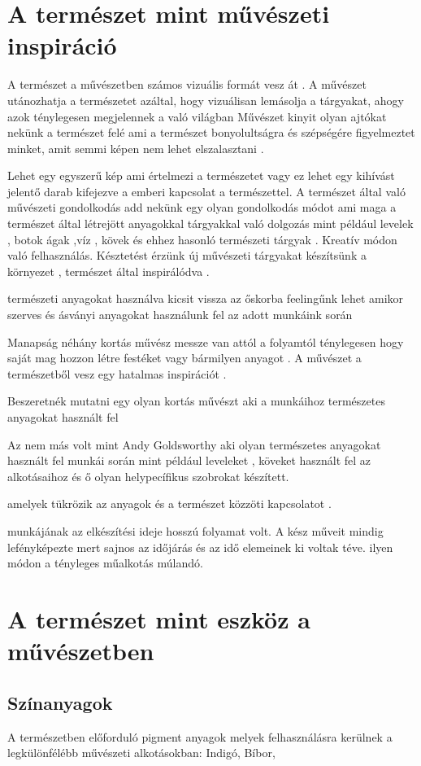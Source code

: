 \documentclass[fontsize=12pt, appendixprefix=true]{scrreprt}
\begin{document}
\section{A természet mint művészeti inspiráció}
A  természet a művészetben számos vizuális formát vesz át .
A művészet utánozhatja a természetet azáltal, hogy vizuálisan lemásolja a tárgyakat, ahogy azok ténylegesen megjelennek a való  világban 
Művészet kinyit olyan ajtókat nekünk a természet felé ami a természet  bonyolultságra  és szépségére figyelmeztet minket,
amit semmi képen nem lehet elszalasztani .

Lehet egy egyszerű kép ami értelmezi a természetet vagy ez lehet egy kihívást jelentő darab kifejezve a  emberi kapcsolat a természettel.
A természet által való művészeti gondolkodás add nekünk egy olyan gondolkodás módot  ami maga a természet által létrejött anyagokkal tárgyakkal való dolgozás  mint például levelek , botok ágak ,víz , kövek és ehhez hasonló természeti tárgyak .
Kreatív módon való felhasználás.
Késztetést érzünk új művészeti tárgyakat készítsünk a környezet , természet  által inspirálódva .

természeti anyagokat használva kicsit vissza az őskorba feelingűnk lehet amikor szerves és ásványi anyagokat használunk fel az adott munkáink során 

Manapság néhány kortás művész messze van attól a folyamtól ténylegesen hogy saját mag hozzon létre festéket vagy bármilyen anyagot .
A művészet a természetből vesz egy hatalmas inspirációt .

Beszeretnék mutatni egy olyan kortás művészt aki a munkáihoz természetes anyagokat használt fel 

Az nem más volt mint  Andy Goldsworthy  aki olyan természetes anyagokat használt fel munkái során  mint például leveleket , köveket használt fel az alkotásaihoz és ő olyan helypecífikus szobrokat készített.

amelyek tükrözik az anyagok és a természet közzöti kapcsolatot .

munkájának az elkészítési ideje hosszú folyamat volt.
A kész műveit mindig lefényképezte mert sajnos  az időjárás és az idő elemeinek ki voltak téve.
 ilyen  módon a tényleges műalkotás múlandó.




\section{A természet mint eszköz a művészetben}
\subsection{Színanyagok}
A természetben előforduló pigment anyagok melyek felhasználásra kerülnek a legkülönfélébb művészeti alkotásokban:
Indigó, Bíbor, 
\end{document}
